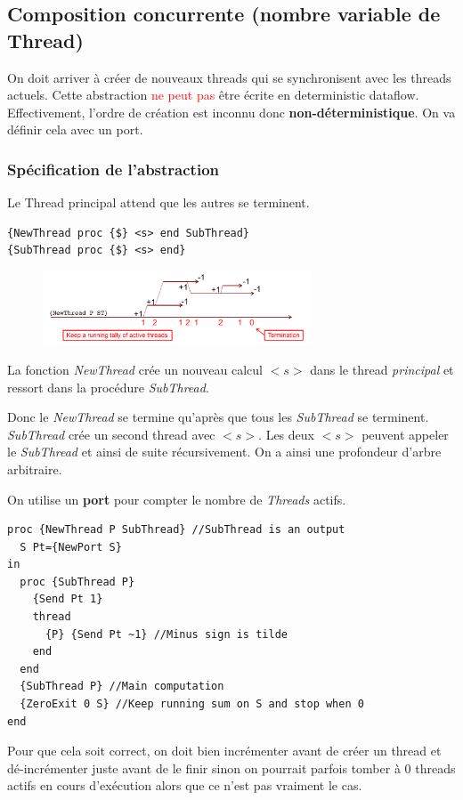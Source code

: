 \documentclass{report}
\begin{document}
\subsection{Composition concurrente (nombre variable de Thread)}
On doit arriver à créer de nouveaux threads qui se synchronisent avec les threads actuels. Cette abstraction \textcolor{red}{ne peut pas} être écrite en deterministic dataflow. Effectivement, l'ordre de création est inconnu donc \textbf{non-déterministique}. On va définir cela avec un port.

\subsubsection{Spécification de l'abstraction}
Le Thread principal attend que les autres se terminent. 
\begin{lstlisting}[escapechar=\%]
{NewThread proc {$} <s> end SubThread} 
{SubThread proc {$} <s> end}
\end{lstlisting}
\begin{figure}
\centering
\includegraphics[width=8cm]{img/newThread.png}
\end{figure}
La fonction \textit{NewThread} crée un nouveau calcul $<s>$ dans le thread \textit{principal} et ressort dans la procédure \textit{SubThread}.\par 
Donc le \textit{NewThread} se termine qu'après que tous les \textit{SubThread} se terminent. \textit{SubThread} crée un second thread avec $<s>$. Les deux $<s>$ peuvent appeler le \textit{SubThread} et ainsi de suite récursivement. On a ainsi une profondeur d'arbre arbitraire.\par 
On utilise un \textbf{port} pour compter le nombre de \textit{Threads} actifs. 
\begin{lstlisting}[escapechar=\%]
proc {NewThread P SubThread} //SubThread is an output 
  S Pt={NewPort S}
in
  proc {SubThread P} 
    {Send Pt 1} 
    thread 
      {P} {Send Pt ~1} //Minus sign is tilde
    end
  end 
  {SubThread P} //Main computation 
  {ZeroExit 0 S} //Keep running sum on S and stop when 0
end
\end{lstlisting}
Pour que cela soit correct, on doit bien incrémenter avant de créer un thread et dé-incrémenter juste avant de le finir sinon on pourrait parfois tomber à 0 threads actifs en cours d'exécution alors que ce n'est pas vraiment le cas.
\end{document}
